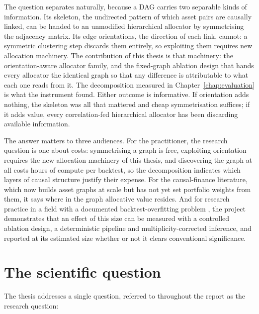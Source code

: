 The question separates naturally, because a DAG carries two separable kinds
of information. Its skeleton, the undirected pattern of which asset
pairs are causally linked, can be handed to an unmodified hierarchical
allocator by symmetrising the adjacency matrix. Its edge
orientations, the direction of each link, cannot: a symmetric clustering
step discards them entirely, so exploiting them requires new allocation
machinery.
The contribution of this thesis is that machinery: the orientation-aware
allocator family, and the fixed-graph ablation design that hands every
allocator the identical graph so that any difference is attributable to
what each one reads from it. The decomposition measured in
Chapter~\ref{chap:evaluation} is what the instrument found. Either outcome
is informative. If orientation adds nothing, the skeleton was all that
mattered and cheap symmetrisation suffices; if it adds value, every
correlation-fed hierarchical allocator has been discarding available
information.

The answer matters to three audiences. For the practitioner, the research
question is one about costs: symmetrising a graph is free, exploiting orientation
requires the new allocation machinery of this thesis, and discovering the
graph at all costs hours of compute per backtest, so the decomposition
indicates which layers of causal structure justify their expense. For
the causal-finance literature, which now builds asset graphs at scale but
has not yet set portfolio weights from them, it says where in the graph
allocative value resides. And for research practice in a field
with a documented backtest-overfitting problem
\cite{bailey2014deflated,lopezdeprado2023causal}, the project demonstrates
that an effect of this size can be measured with a controlled ablation
design, a deterministic pipeline and multiplicity-corrected inference, and
reported at its estimated size whether or not it clears conventional
significance.

\section{The scientific question}
\label{sec:question}

The thesis addresses a single question, referred to throughout the report as
the research question:

\begin{quote}
\noindent{}
\end{quote}

